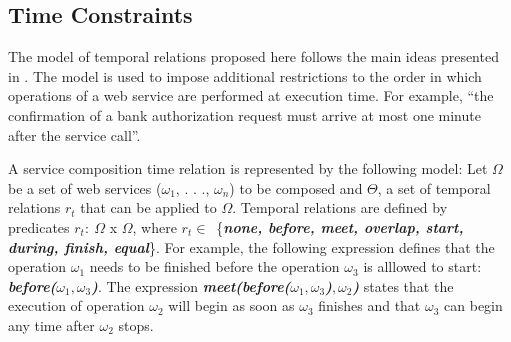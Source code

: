 \documentclass{sig-alternate}
\begin{document}


\subsection{Time Constraints}
\label{proposal:temporalModel}


The model of temporal relations proposed here follows the main ideas presented in
\cite{Allen83, BeVaC00}. The model is used to impose additional restrictions to
the order in which operations of a web service are performed at execution time.
For example, ``the confirmation of a bank authorization request must arrive at
most one minute after the service call''.


 
A service composition time relation is represented by the following
model: Let   $\Omega$ be a set of web services ($\omega_1$, . . .,
$\omega_n$) to be composed and $\Theta$, a set of temporal relations $r_t$ that can be applied to $\Omega$. 
Temporal relations are defined by predicates $r_t:\ \Omega$ x $\Omega$, where
$r_t \in$~\{\textbf{\textit{none, before, meet, overlap, start, during, finish, equal}}\}. 
For example, the following expression defines that the operation $\omega_1$ needs to be finished before the operation $\omega_3$ is alllowed to start: 
\textbf{\textit{before($\omega_1, \omega_3$)}}.  
The expression \textbf{\textit{meet(before($\omega_1, \omega_3$)$, \omega_2$)}} states that the execution of operation $\omega_2$ will begin as soon as $\omega_3$ finishes and that $\omega_3$ can begin any time after $\omega_2$ stops.
\end{document}
